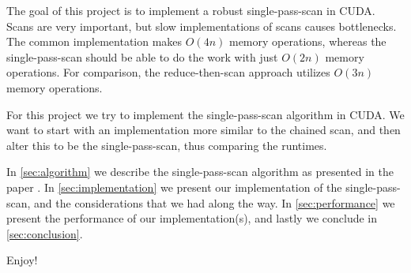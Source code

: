 The goal of this project is to implement a robust single-pass-scan in CUDA.
Scans are very important, but slow implementations of scans causes bottlenecks.
The common implementation makes $O(4n)$ memory operations, whereas the single-pass-scan should be able to do the work with just $O(2n)$ memory operations.
For comparison, the reduce-then-scan approach utilizes $O(3n)$ memory operations.

For this project we try to implement the single-pass-scan algorithm in CUDA.
We want to start with an implementation more similar to the chained scan, and then alter this to be the single-pass-scan, thus comparing the runtimes.

In \autoref{sec:algorithm} we describe the single-pass-scan algorithm as presented in the paper \cite{spsArticle}.
In \autoref{sec:implementation} we present our implementation of the single-pass-scan, and the considerations that we had along the way.
In \autoref{sec:performance} we present the performance of our implementation(s), and lastly we conclude in \autoref{sec:conclusion}.

Enjoy!
